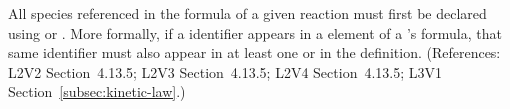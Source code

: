 All species referenced in the \KineticLaw formula of a given reaction must
first be declared using \SpeciesReference or \ModifierSpeciesReference.
More formally, if a \Species identifier appears in a  element of
a \Reaction's \KineticLaw formula, that same identifier must also appear in
at least one \SpeciesReference or \ModifierSpeciesReference in the
\Reaction definition.  (References: L2V2 Section~4.13.5; L2V3
Section~4.13.5; L2V4 Section~4.13.5; L3V1 Section~\ref{subsec:kinetic-law}.)
